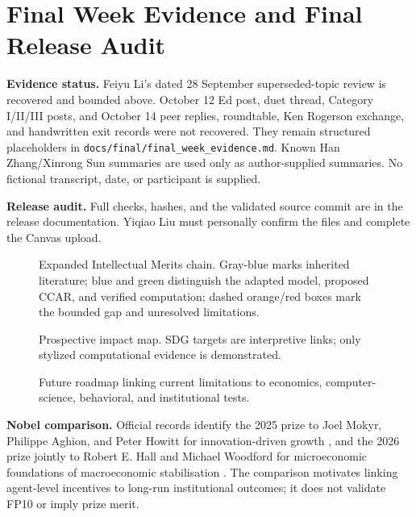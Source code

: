 \section{Final Week Evidence and Final Release Audit}
\textbf{Evidence status.} Feiyu Li's dated 28 September superseded-topic review is recovered and bounded above. October 12 Ed post, duet thread, Category I/II/III posts, and October 14 peer replies, roundtable, Ken Rogerson exchange, and handwritten exit records were not recovered. They remain structured placeholders in \texttt{docs/final/final\_week\_evidence.md}. Known Han Zhang/Xinrong Sun summaries are used only as author-supplied summaries. No fictional transcript, date, or participant is supplied.

\textbf{Release audit.} Full checks, hashes, and the validated source commit are in the release documentation. Yiqiao Liu must personally confirm the files and complete the Canvas upload.

\begin{figure}[H]\centering\resizebox{.98\textwidth}{!}{}\caption{Expanded Intellectual Merits chain. Gray-blue marks inherited literature; blue and green distinguish the adapted model, proposed CCAR, and verified computation; dashed orange/red boxes mark the bounded gap and unresolved limitations.}\end{figure}
\begin{figure}[H]\centering\resizebox{.98\textwidth}{!}{}\caption{Prospective impact map. SDG targets are interpretive links; only stylized computational evidence is demonstrated.}\end{figure}
\begin{figure}[H]\centering\resizebox{.98\textwidth}{!}{}\caption{Future roadmap linking current limitations to economics, computer-science, behavioral, and institutional tests.}\end{figure}

\textbf{Nobel comparison.} Official records identify the 2025 prize to Joel Mokyr, Philippe Aghion, and Peter Howitt for innovation-driven growth \cite{nobel2025growth}, and the 2026 prize jointly to Robert E. Hall and Michael Woodford for microeconomic foundations of macroeconomic stabilisation \cite{kva2026stabilisation}. The comparison motivates linking agent-level incentives to long-run institutional outcomes; it does not validate FP10 or imply prize merit.
